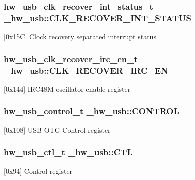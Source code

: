 \subsubsection[{\texorpdfstring{C\+L\+K\+\_\+\+R\+E\+C\+O\+V\+E\+R\+\_\+\+I\+N\+T\+\_\+\+S\+T\+A\+T\+US}{CLK_RECOVER_INT_STATUS}}]{ {\bf hw\+\_\+usb\+\_\+clk\+\_\+recover\+\_\+int\+\_\+status\+\_\+t} \+\_\+hw\+\_\+usb\+::\+C\+L\+K\+\_\+\+R\+E\+C\+O\+V\+E\+R\+\_\+\+I\+N\+T\+\_\+\+S\+T\+A\+T\+US}\hypertarget{struct__hw__usb_a894faa12f48d8b400d12efd1f78a7747}{}\label{struct__hw__usb_a894faa12f48d8b400d12efd1f78a7747}
\mbox{[}0x15C\mbox{]} Clock recovery separated interrupt status 
\subsubsection[{\texorpdfstring{C\+L\+K\+\_\+\+R\+E\+C\+O\+V\+E\+R\+\_\+\+I\+R\+C\+\_\+\+EN}{CLK_RECOVER_IRC_EN}}]{ {\bf hw\+\_\+usb\+\_\+clk\+\_\+recover\+\_\+irc\+\_\+en\+\_\+t} \+\_\+hw\+\_\+usb\+::\+C\+L\+K\+\_\+\+R\+E\+C\+O\+V\+E\+R\+\_\+\+I\+R\+C\+\_\+\+EN}\hypertarget{struct__hw__usb_a0aeb7d516ab6266f25f6cfe5939430db}{}\label{struct__hw__usb_a0aeb7d516ab6266f25f6cfe5939430db}
\mbox{[}0x144\mbox{]} I\+R\+C48M oscillator enable register 
\subsubsection[{\texorpdfstring{C\+O\+N\+T\+R\+OL}{CONTROL}}]{ {\bf hw\+\_\+usb\+\_\+control\+\_\+t} \+\_\+hw\+\_\+usb\+::\+C\+O\+N\+T\+R\+OL}\hypertarget{struct__hw__usb_aac7333660923df50d5ebf4622d645621}{}\label{struct__hw__usb_aac7333660923df50d5ebf4622d645621}
\mbox{[}0x108\mbox{]} U\+SB O\+TG Control register 
\subsubsection[{\texorpdfstring{C\+TL}{CTL}}]{ {\bf hw\+\_\+usb\+\_\+ctl\+\_\+t} \+\_\+hw\+\_\+usb\+::\+C\+TL}\hypertarget{struct__hw__usb_ac3c91e4ef348a72decbe7b3673fa3043}{}\label{struct__hw__usb_ac3c91e4ef348a72decbe7b3673fa3043}
\mbox{[}0x94\mbox{]} Control register 
